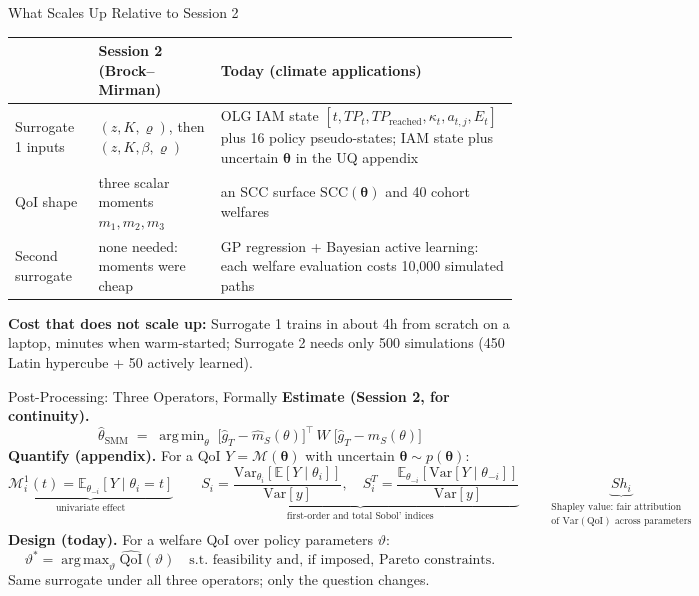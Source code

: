 \documentclass[10pt,aspectratio=169]{beamer}
\DeclareMathOperator*{\argmin}{arg\,min}
\DeclareMathOperator*{\argmax}{arg\,max}
\begin{document}
\begin{frame}{What Scales Up Relative to Session 2}
\small
\begin{center}
\begin{tabular}{p{}p{}p{}}
\toprule
 & \textbf{Session 2 (Brock--Mirman)} & \textbf{Today (climate applications)} \\
\midrule
Surrogate 1 inputs & $(z, K, \varrho)$, then $(z, K, \beta, \varrho)$ & OLG IAM state $[t, TP_t, TP_{\mathrm{reached}}, \kappa_t, a_{t,j}, E_t]$ plus 16 policy pseudo-states; IAM state plus uncertain $\bm{\theta}$ in the UQ appendix \\[3pt]
QoI shape & three scalar moments $m_1, m_2, m_3$ & an SCC surface $\mathrm{SCC}(\bm{\theta})$ and 40 cohort welfares \\[3pt]
Second surrogate & none needed: moments were cheap & GP regression + Bayesian active learning: each welfare evaluation costs 10{,}000 simulated paths \\
\bottomrule
\end{tabular}
\end{center}
\vspace{0.4em}
\textbf{Cost that does not scale up:} Surrogate 1 trains in about 4h from scratch on a laptop, minutes when warm-started; Surrogate 2 needs only 500 simulations (450 Latin hypercube + 50 actively learned).
\end{frame}

\begin{frame}{Post-Processing: Three Operators, Formally}
\footnotesize
\textbf{Estimate (Session 2, for continuity).}
\[
    \widehat\theta_{\text{SMM}} \;=\; \argmin_{\theta} \;
        \bigl[\widehat g_T - \widehat m_S(\theta)\bigr]^{\!\top}\, W \;
        \bigl[\widehat g_T - \widehat m_S(\theta)\bigr]
\]
\textbf{Quantify (appendix).} For a QoI $Y = \mathcal{M}(\bm{\theta})$ with uncertain $\bm{\theta} \sim p(\bm{\theta})$:
\[
  \underbrace{\mathcal{M}^{1}_{i}(t) = \mathbb{E}_{\theta_{-i}}\!\left[ Y \mid \theta_{i}=t \right]}_{\text{univariate effect}}
  \qquad
  \underbrace{S_{i} = \frac{\mathrm{Var}_{\theta_{i}}\!\left[ \mathbb{E}\left[ Y \mid \theta_{i} \right] \right]}{\mathrm{Var}\left[ y \right]}, \quad
  S^{T}_{i} = \frac{\mathbb{E}_{\theta_{-i}}\!\left[\mathrm{Var}\left[ Y \mid \theta_{-i} \right]\right]}{\mathrm{Var}\left[ y \right]}}_{\text{first-order and total Sobol' indices}}
  \qquad
  \underbrace{Sh_{i}}_{\substack{\text{Shapley value: fair attribution} \\ \text{of } \mathrm{Var}(\mathrm{QoI}) \text{ across parameters}}}
\]
\textbf{Design (today).} For a welfare QoI over policy parameters $\vartheta$:
\[
   \vartheta^* = \argmax_{\vartheta} \widehat{\mathrm{QoI}}(\vartheta)
   \quad \text{s.t. feasibility and, if imposed, Pareto constraints.}
\]
\vspace{0.1em}
Same surrogate under all three operators; only the question changes.
\end{frame}
\end{document}
